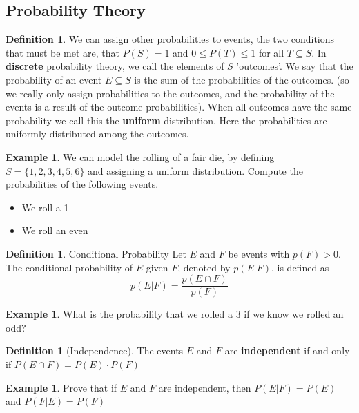 \documentclass[letterpaper,10pt]{article}
\theoremstyle{plain}
\theoremstyle{definition}
\newtheorem{defn}[thm]{Definition}
\newtheorem{exmp}[thm]{Example}
\theoremstyle{remark}
\begin{document}
\subsection{Probability Theory}
\begin{defn}
We can assign other probabilities to events, the two conditions that must be met are, that $P(S)=1$ and $0\leq P(T)\leq 1$ for all $T\subseteq S$.
\newline
In \textbf{discrete} probability theory, we call the elements of $S$ 'outcomes'. We say that the probability of an event $E\subseteq S$ is the sum of the probabilities of the outcomes. (so we really only assign probabilities to the outcomes, and the probability of the events is a result of the outcome probabilities). When all outcomes have the same probability we call this the \textbf{uniform} distribution. Here the probabilities are uniformly distributed among the outcomes.
\end{defn}
\begin{exmp}
We can model the rolling of a fair die, by defining $S=\{1,2,3,4,5,6\}$ and assigning a uniform distribution. 
\newline
Compute the probabilities of the following events. 
\newline
\begin{itemize}
\item We roll a 1
\vspace{1cm}
\item We roll an even
\vspace{1cm}
\end{itemize}
\end{exmp}
\begin{defn}{Conditional Probability}
Let $E$ and $F$ be events with $p(F) > 0$. The conditional probability of $E$ given $F$, denoted by $p(E | F)$, is defined as
\[
p(E | F) = \frac{p(E \cap F)}{p(F)}
\]
\end{defn}
\begin{exmp}What is the probability that we rolled a 3 if we know we rolled an odd?
\vspace{1cm}
\end{exmp}
\begin{defn}[Independence]
The events $E$ and $F$ are \textbf{independent} if and only if $P(E \cap F)=P(E)\cdot P(F)$
\end{defn}
\begin{exmp}Prove that if $E$ and $F$ are independent, then
\newline
$P(E|F)=P(E)$ and $P(F|E)=P(F)$
\vspace{2cm}

\end{exmp}
\end{document}
